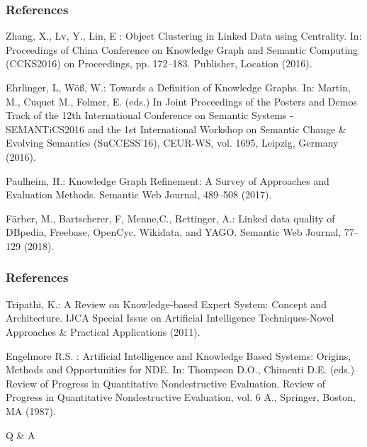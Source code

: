 \documentclass{beamer}
\begin{document}

\begin{frame}
\frametitle{References}
\footnotesize{
\begin{thebibliography}{99} %
Zhang, X., Lv, Y., Lin, E : Object Clustering in Linked Data using Centrality. In: Proceedings of China Conference on Knowledge Graph and Semantic Computing (CCKS2016)
on Proceedings, pp. 172--183. Publisher, Location (2016). 

Ehrlinger, L, W{\"o}{\ss}, W.: Towards a Definition of Knowledge Graphs. In: Martin, M., Cuquet M., Folmer, E. (eds.) In Joint Proceedings of the Posters and Demos Track of the 12th International Conference on Semantic Systems - SEMANTiCS2016 and the 1st International Workshop on Semantic Change \& Evolving Semantics (SuCCESS'16), CEUR-WS, vol. 1695, Leipzig, Germany (2016). 

Paulheim, H.: Knowledge Graph Refinement: A Survey of Approaches and Evaluation Methods. Semantic Web Journal, 489--508 (2017). 

F{\"a}rber, M., Bartscherer, F, Menne,C., Rettinger, A.: Linked data quality of DBpedia, Freebase, OpenCyc, Wikidata, and YAGO. Semantic Web Journal, 77--129 (2018). 


\end{thebibliography}
}
\end{frame}


\begin{frame}
\frametitle{References}
\footnotesize{
\begin{thebibliography}{99} %
Tripathi, K.: A Review on Knowledge-based Expert System: Concept and Architecture. IJCA Special Issue on Artificial Intelligence Techniques-Novel Approaches \& Practical Applications (2011). 

Engelmore R.S.  : Artificial Intelligence and Knowledge Based Systems: Origins, Methods and Opportunities for NDE. In: Thompson D.O., Chimenti D.E. (eds.) Review of Progress in Quantitative Nondestructive Evaluation. Review of Progress in Quantitative Nondestructive Evaluation, vol. 6 A., 
Springer, Boston, MA (1987). 

\end{thebibliography}
}
\end{frame}





\begin{frame}
\Huge{\centerline{Q \& A}}
\end{frame}

\end{document}

